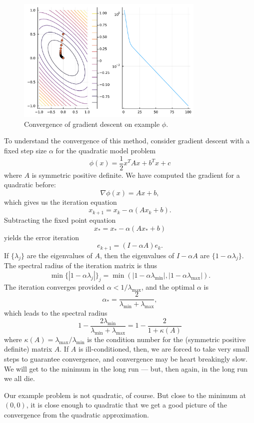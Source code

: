 \documentclass[12pt, leqno]{article} %
\begin{document}
\begin{figure}
\begin{center}
  \includegraphics[width=0.8\textwidth]{fig/2023-03-31-gradient.pdf}
\end{center}
\caption{Convergence of gradient descent on example $\phi$.}
\label{fig:gradient}
\end{figure}

To understand the convergence of this method, consider gradient descent
with a fixed step size \(\alpha\) for the quadratic model problem
\[\phi(x) = \frac{1}{2} x^T A x + b^T x + c\] where \(A\) is symmetric
positive definite. We have computed the gradient for a quadratic before:
\[\nabla \phi(x) = Ax + b,\] which gives us the iteration equation
\[x_{k+1} = x_k - \alpha (A x_k + b).\] Subtracting the fixed point
equation \[x_* = x_* - \alpha (A x_* + b)\] yields the error iteration
\[e_{k+1} = (I-\alpha A) e_k.\] If \(\{ \lambda_j \}\) are the
eigenvalues of \(A\), then the eigenvalues of \(I-\alpha A\) are
\(\{ 1-\alpha \lambda_j \}\). The spectral radius of the iteration
matrix is thus \[\min \{ |1-\alpha \lambda_j| \}_j =
  \min \left( |1-\alpha \lambda_{\min}|, |1-\alpha \lambda_{\max}| \right).\]
The iteration converges provided \(\alpha < 1/\lambda_{\max}\), and the
optimal \(\alpha\) is
\[\alpha_* = \frac{2}{\lambda_{\min} + \lambda_{\max}},\] which leads to
the spectral radius
\[1 - \frac{2 \lambda_{\min}}{\lambda_{\min} + \lambda_{\max}} =
  1 - \frac{2}{1 + \kappa(A)}\] where
\(\kappa(A) = \lambda_{\max}/\lambda_{\min}\) is the condition number
for the (symmetric positive definite) matrix \(A\). If \(A\) is
ill-conditioned, then, we are forced to take very small steps to
guarantee convergence, and convergence may be heart breakingly slow. We
will get to the minimum in the long run --- but, then again, in the long
run we all die.

Our example problem is not quadratic, of course. But close to the
minimum at \((0,0)\), it is close enough to quadratic that we get a good
picture of the convergence from the quadratic approximation.
\end{document}
